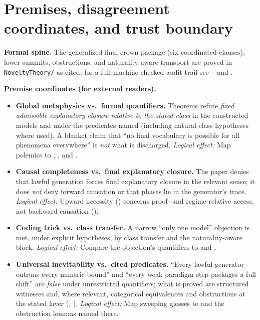 \documentclass[11pt,a4paper]{article}
\newenvironment{keybox}[1]{%
  \Needspace*{8\baselineskip}%
  \begin{tcolorbox}[
    enhanced, breakable=false,
    colback=blue!5, colframe=blue!45!black, coltitle=black,
    colbacktitle=blue!14, boxrule=0.85pt, arc=2.5pt,
    left=9pt, right=9pt, top=6pt, bottom=6pt,
    titlerule=0.55pt, fonttitle=\bfseries, title={#1},
    before upper=\raggedright,
    before skip=0.9\baselineskip, after skip=0.9\baselineskip
  ]%
}{%
  \end{tcolorbox}%
}
\theoremstyle{definition}
\begin{document}
\section{Premises, disagreement coordinates, and trust boundary}\label{sec:premises-novelty-crown}
\begin{keybox}{Where disagreement can (and cannot) live}
\textbf{Formal spine.}
The generalized final crown package (six coordinated clauses), lower summits, obstructions, and naturality-aware transport are proved in \texttt{NoveltyTheory/} as cited; for a full machine-checked audit trail see -- and .

\medskip
\textbf{Premise coordinates (for external readers).}
{\raggedright
\begin{itemize}[leftmargin=2em]
\item \textbf{Global metaphysics vs.\ formal quantifiers.} Theorems refute \emph{fixed admissible explanatory closure} \emph{relative to the stated class} in the constructed models and under the predicates named (including natural-class hypotheses where used). A blanket claim that ``no final vocabulary is possible for all phenomena everywhere'' is \emph{not} what is discharged.
  \emph{Logical effect:} Map polemics to , , and .

\item \textbf{Causal completeness vs.\ final explanatory closure.} The paper denies that lawful generation forces final explanatory closure in the relevant sense; it does \emph{not} deny forward causation or that phases lie in the generator's trace.
  \emph{Logical effect:} Upward necessity () concerns proof- and regime-relative access, not backward causation ().

\item \textbf{Coding trick vs.\ class transfer.} A narrow ``only one model'' objection is met, under explicit hypotheses, by class transfer and the naturality-aware block.
  \emph{Logical effect:} Compare the objection's quantifiers to  and .

\item \textbf{Universal inevitability vs.\ cited predicates.} ``Every lawful generator outruns every numeric bound'' and ``every weak paradigm step packages a full shift'' are \emph{false} under unrestricted quantifiers; what is proved are structured witnesses and, where relevant, categorical equivalences and obstructions at the stated layer (, ).
  \emph{Logical effect:} Map sweeping glosses to  and the obstruction lemmas named there.
\end{itemize}
\par}
\end{keybox}
\end{document}
